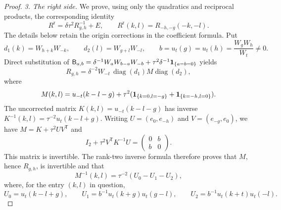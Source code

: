 \begin{proof}
\emph{3. The right side.} We prove, using only the quadratics and
reciprocal products, the corresponding identity
\begin{equation}\label{allodd:right-inverse}
 R^{\mathrm r}=\delta\tau^2 R_{g,h}^{-1}+E,
 \qquad
 R^{\mathrm r}(k,l)=R_{-h,-g}(-k,-l).
\end{equation}
The details below retain the origin corrections in the coefficient formula.
Put
\[
 d_1(k)=W_{h+k}W_{-k},\qquad d_2(l)=W_{g+l}W_{-l},
 \qquad b=u_t(g)=u_t(h)=\frac{W_gW_h}{W_t}\ne0.
\]
Direct substitution of
$\mathsf B_{a,b}=\delta^{-1}W_aW_{b-a}W_{-b}
+\tau^2\delta^{-1}\mathbf1_{\{a=b=0\}}$ yields
\begin{equation}\label{allodd:right-factor}
 R_{g,h}=\delta^{-2}W_{-t}\,
                   \operatorname{diag}(d_1)M\operatorname{diag}(d_2),
\end{equation}
where
\[
 M(k,l)=u_{-t}(k-l-g)
       +\tau^2(\mathbf1_{\{k=0,l=-g\}}+\mathbf1_{\{k=-h,l=0\}}).
\]
The uncorrected matrix $K(k,l)=u_{-t}(k-l-g)$ has inverse
$K^{-1}(k,l)=\tau^{-2}u_t(k-l+g)$.
Writing $U=(e_0,e_{-h})$ and $V=(e_{-g},e_0)$, we have
$M=K+\tau^2 UV^{\mathsf T}$ and
\[
 I_2+\tau^2V^{\mathsf T}K^{-1}U=
       \begin{pmatrix}0&b\\b&0\end{pmatrix}.
\]
This matrix is invertible.  The rank-two inverse formula therefore
proves that $M$, hence $R_{g,h}$, is invertible and that
\begin{equation}\label{allodd:woodbury}
 M^{-1}(k,l)=\tau^{-2}(U_0-U_1-U_2),
\end{equation}
where, for the entry $(k,l)$ in question,
\[
 U_0=u_t(k-l+g),\qquad
 U_1=b^{-1}u_t(k+g)u_t(g-l),\qquad
 U_2=b^{-1}u_t(k+t)u_t(-l).
\]


\end{proof}
